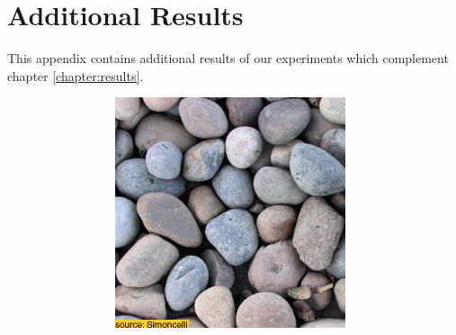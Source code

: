 \chapter{Additional Results}
\label{chapter:appendix-results}

This appendix contains additional results of our experiments which complement chapter \ref{chapter:results}.

\begin{figure}[]
    \centering    
    \begin{subfigure}{\textwidth}
        \centering
        \begin{subfigure}{0.24\textwidth}
            \centering
            \includegraphics[width=\textwidth]{images/04-experiment01/pebbles/target.jpg}
            \caption*{}
        \end{subfigure}
        \hfill
        \begin{subfigure}{0.24\textwidth}
            \centering

\end{subfigure}
\end{subfigure}
\end{figure}
